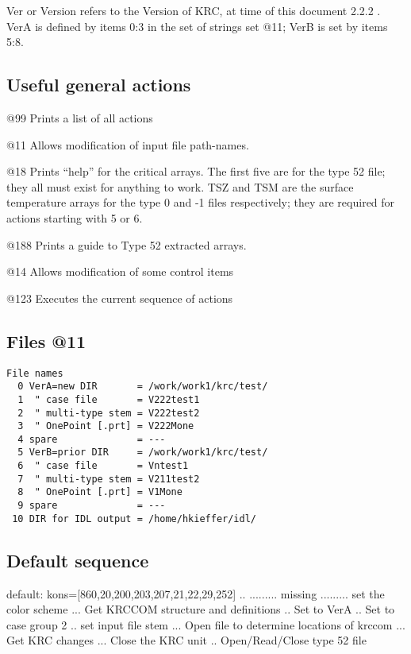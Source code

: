 \documentclass{article}  %
\begin{document}
Ver or Version refers to the Version of KRC, at time of this document 2.2.2 .
 VerA is defined by items 0:3 in the set of strings set @11; VerB is set by items 5:8.


\subsection{ Useful general actions}

@99 Prints a list of all actions

@11 Allows modification of input file path-names.

@18 Prints ``help''  for the critical arrays. The first five are for the type 52 file; they all must exist for anything to work.  TSZ and TSM are the surface temperature arrays for the type 0 and -1 files respectively; they are required for actions starting with 5 or 6.

@188 Prints a guide to Type 52 extracted arrays.

@14  Allows modification of some control items

@123 Executes the current sequence of actions 

\subsection{Files  @11} %
\vspace{-3.mm} 
\begin{verbatim}
File names
  0 VerA=new DIR       = /work/work1/krc/test/
  1  " case file       = V222test1
  2  " multi-type stem = V222test2
  3  " OnePoint [.prt] = V222Mone
  4 spare              = ---
  5 VerB=prior DIR     = /work/work1/krc/test/
  6  " case file       = Vntest1
  7  " multi-type stem = V211test2
  8  " OnePoint [.prt] = V1Mone
  9 spare              = ---
 10 DIR for IDL output = /home/hkieffer/idl/
\end{verbatim}
\subsection{Default sequence} %
default: kons=[860,20,200,203,207,21,22,29,252]
\qi {}.. ......... missing ......... set the color scheme
\qi {}... Get KRCCOM structure and definitions
\qi {}.. Set to VerA 
\qi {}.. Set to case group 2
\qi {}.. set input file stem
\qi {}... Open file to determine locations of krccom
\qi {}... Get KRC changes
\qi {}... Close the KRC unit
\qi {}.. Open/Read/Close type 52 file
\end{document}
